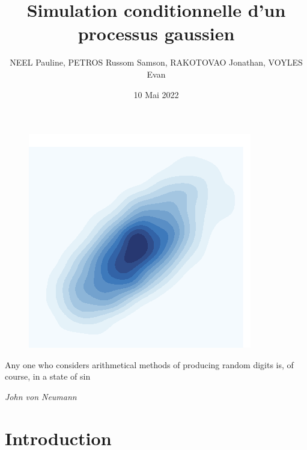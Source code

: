 \documentclass[10pt]{article} %
\title{Simulation conditionnelle d’un processus gaussien}
\author{NEEL Pauline, PETROS Russom Samson, RAKOTOVAO Jonathan, VOYLES Evan}
\date{10 Mai 2022}
\begin{document}
\begin{titlepage}

\maketitle

\begin{figure}[h!]
    \centering
    \includegraphics{media/plot.png}
\end{figure}

\vspace{3cm}





\epigraph{Any one who considers arithmetical methods of producing random digits is, of course, in a state of sin}
 {\textit{John von Neumann}}

\newpage

\end{titlepage}

\pagestyle{fancy}

\tableofcontents

\newpage

\section{Introduction}
\end{document}
